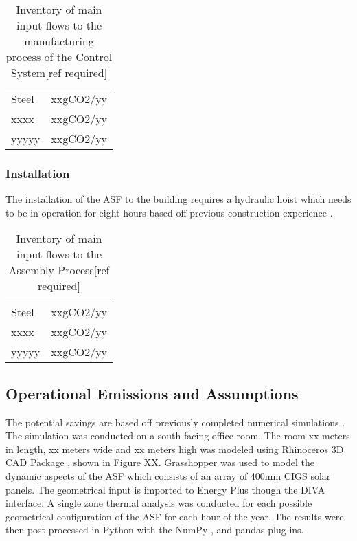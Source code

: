 \begin{table}[H]
\centering
\begin{tabular}{ll}
\hline
Steel & xxgCO2/yy \\
xxxx  & xxgCO2/yy \\
yyyyy & xxgCO2/yy \\
\hline
\end{tabular}
\caption{Inventory of main input flows to the manufacturing process of the Control System[ref required]}
\label{tab:ControlInv}
\end{table}

\subsubsection*{Installation}

The installation of the ASF to the building requires a hydraulic hoist which needs to be in operation for eight hours based off previous construction experience \cite{jayathissa2015abs}. \\

\begin{table}[H]
\centering
\begin{tabular}{ll}
\hline
Steel & xxgCO2/yy \\
xxxx  & xxgCO2/yy \\
yyyyy & xxgCO2/yy \\
\hline
\end{tabular}
\caption{Inventory of main input flows to the Assembly Process[ref required]}
\label{tab:AssemblyInv}
\end{table}


\subsection{Operational Emissions and Assumptions}

The potential savings are based off previously completed numerical simulations \cite{jayathissa2015abs}. The simulation was conducted on a south facing office room. The room xx meters in length, xx meters wide and xx meters high was modeled using Rhinoceros 3D CAD Package \cite{Rhino}, shown in Figure XX. Grasshopper \cite{grasshopper} was used to model the dynamic aspects of the ASF which consists of an array of 400mm CIGS solar panels. The geometrical input is imported to Energy Plus \cite{energyplus} though the DIVA \cite{DIVA} interface. A single zone thermal analysis was conducted for each possible geometrical configuration of the ASF for each hour of the year. The results were then post processed in Python \cite{python} with the NumPy \cite{numpy}, and pandas \cite{pandas} plug-ins. \\

